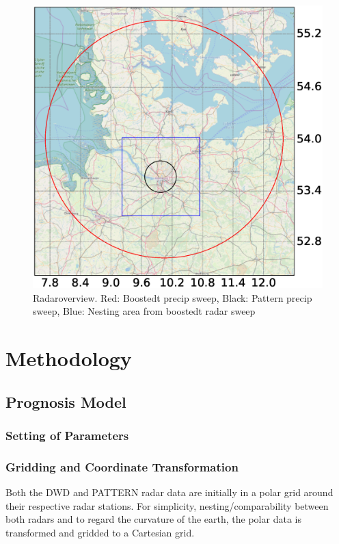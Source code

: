 \documentclass[11pt,twoside,a4paper,fleqn]{report}
\numberwithin{equation}{chapter}
\numberwithin{figure}{chapter}
\numberwithin{table}{chapter}
\begin{document}
\begin{figure}
	\centering
	\includegraphics[width=\textwidth,trim={0 0 0 0}, clip]{radarOverview.eps}
	\caption{Radaroverview. Red: Boostedt precip sweep, Black: Pattern precip sweep, Blue: Nesting area from boostedt radar sweep}
	\label{fig:radarOverview}
\end{figure}
\chapter{Methodology}
\section{Prognosis Model}
\subsection{Setting of Parameters}
\subsection{Gridding and Coordinate Transformation}
Both the DWD and PATTERN radar data are initially in a polar grid around their respective radar stations. For simplicity, nesting/comparability between both radars and to regard the curvature of the earth, the polar data is transformed and gridded to a Cartesian grid. 
\end{document}
